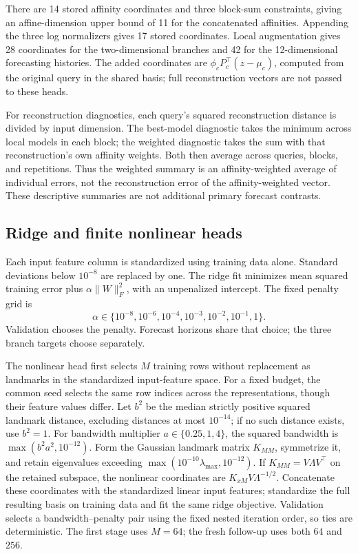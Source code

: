 There are 14 stored affinity coordinates and three block-sum constraints,
giving an affine-dimension upper bound of 11 for the concatenated
affinities. Appending the three log normalizers gives 17 stored
coordinates. Local augmentation gives 28 coordinates for the
two-dimensional branches and 42 for the 12-dimensional forecasting
histories. The added coordinates are
$\phi_c P_c^\top(z-\mu_c)$, computed from the original query in the
shared basis; full reconstruction vectors are not passed to these heads.

For reconstruction diagnostics, each query's squared reconstruction
distance is divided by input dimension. The best-model diagnostic
takes the minimum across local models in each block; the weighted
diagnostic takes the sum with that reconstruction's own affinity weights.
Both then average across queries, blocks, and repetitions. Thus the
weighted summary is an affinity-weighted average of individual errors,
not the reconstruction error of the affinity-weighted vector. These
descriptive summaries are not additional primary forecast contrasts.

\subsection{Ridge and finite nonlinear heads}

Each input feature column is standardized using training data alone.
Standard deviations below $10^{-8}$ are replaced by one. The ridge
fit minimizes mean squared training error plus
$\alpha\|W\|_F^2$, with an unpenalized intercept. The fixed penalty
grid is
\[
 \alpha\in\{10^{-8},10^{-6},10^{-4},10^{-3},10^{-2},10^{-1},1\}.
\]
Validation chooses the penalty. Forecast horizons share that choice;
the three branch targets choose separately.

The nonlinear head first selects $M$ training rows without replacement
as landmarks in the standardized input-feature space. For a fixed
budget, the common seed selects the same row indices across the
representations, though their feature values differ. Let $b^2$ be the
median strictly positive squared landmark distance, excluding distances
at most $10^{-14}$; if no such distance exists, use $b^2=1$.
For bandwidth multiplier $a\in\{0.25,1,4\}$, the squared bandwidth is
$\max(b^2a^2,10^{-12})$. Form the Gaussian landmark matrix $K_{MM}$,
symmetrize it, and retain eigenvalues exceeding
$\max(10^{-10}\lambda_{\max},10^{-12})$. If
$K_{MM}=V\Lambda V^\top$ on the retained subspace, the nonlinear
coordinates are $K_{xM}V\Lambda^{-1/2}$. Concatenate these coordinates
with the standardized linear input features; standardize the full
resulting basis on training data and fit the same ridge objective.
Validation selects a bandwidth--penalty pair using the fixed nested
iteration order, so ties are deterministic. The first stage uses
$M=64$; the fresh follow-up uses both $64$ and $256$.

